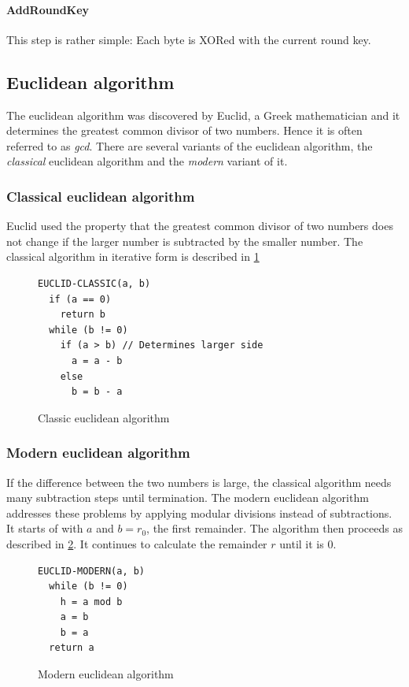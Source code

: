 \paragraph{AddRoundKey}
This step is rather simple: Each byte is XORed with the current round key.

\subsection{Euclidean algorithm}

The euclidean algorithm was discovered by Euclid, a Greek mathematician and it
determines the greatest common divisor of two numbers.
Hence it is often referred to as \textit{gcd}. There are several variants
of the euclidean algorithm, the \textit{classical} euclidean algorithm and the
\textit{modern} variant of it.

\subsubsection{Classical euclidean algorithm}

Euclid used the property that the greatest common divisor of two numbers does
not change if the larger number is subtracted by the smaller number. The classical
algorithm in iterative form is described in \ref{code:euclid_classic}

\begin{figure}
\begin{lstlisting}
EUCLID-CLASSIC(a, b)
  if (a == 0)
    return b
  while (b != 0)
    if (a > b) // Determines larger side
      a = a - b
    else
      b = b - a
\end{lstlisting}
\caption{Classic euclidean algorithm}
\label{code:euclid_classic}
\end{figure}

\subsubsection{Modern euclidean algorithm}

If the difference between the two numbers is large, the classical algorithm
needs many subtraction steps until termination. The modern euclidean algorithm
addresses these problems by applying modular divisions instead of subtractions.
It starts of with $a$ and $b = r_0$, the first remainder. The algorithm then
proceeds as described in \ref{code:euclid_modern}. It continues to
calculate the remainder $r$ until it is $0$.

\begin{figure}
\begin{lstlisting}
EUCLID-MODERN(a, b)
  while (b != 0)
    h = a mod b
    a = b
    b = a
  return a
\end{lstlisting}
\caption{Modern euclidean algorithm}
\label{code:euclid_modern}
\end{figure}


